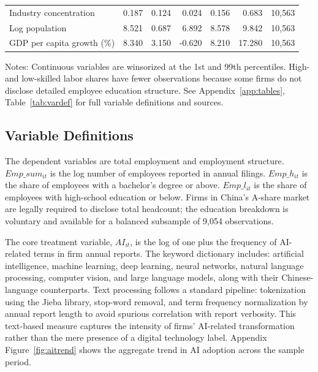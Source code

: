 \documentclass[12pt,a4paper]{article}
\theoremstyle{predstyle}
\theoremstyle{plain}
\begin{document}
\begin{table}[H]
\begin{threeparttable}
\begin{tabular}{lrrrrrr}
Industry concentration & 0.187 & 0.124 & 0.024 & 0.156 & 0.683 & 10,563 \\
Log population & 8.521 & 0.687 & 6.892 & 8.578 & 9.842 & 10,563 \\
GDP per capita growth (\%) & 8.340 & 3.150 & -0.620 & 8.210 & 17.280 & 10,563 \\
\bottomrule
\end{tabular}
\begin{tablenotes}
\footnotesize
\item Notes: Continuous variables are winsorized at the 1st and 99th percentiles. High- and low-skilled labor shares have fewer observations because some firms do not disclose detailed employee education structure. See Appendix~\ref{app:tables}, Table~\ref{tab:vardef} for full variable definitions and sources.
\end{tablenotes}
\end{threeparttable}
\end{table}

\subsection{Variable Definitions}

The dependent variables are total employment and employment structure. \(Emp\_sum_{it}\) is the log number of employees reported in annual filings. \(Emp\_h_{it}\) is the share of employees with a bachelor's degree or above. \(Emp\_l_{it}\) is the share of employees with high-school education or below. Firms in China's A-share market are legally required to disclose total headcount; the education breakdown is voluntary and available for a balanced subsample of 9,054 observations.

The core treatment variable, \(AI_{it}\), is the log of one plus the frequency of AI-related terms in firm annual reports. The keyword dictionary includes: artificial intelligence, machine learning, deep learning, neural networks, natural language processing, computer vision, and large language models, along with their Chinese-language counterparts. Text processing follows a standard pipeline: tokenization using the Jieba library, stop-word removal, and term frequency normalization by annual report length to avoid spurious correlation with report verbosity. This text-based measure captures the intensity of firms' AI-related transformation rather than the mere presence of a digital technology label. Appendix Figure~\ref{fig:aitrend} shows the aggregate trend in AI adoption across the sample period.
\end{document}
